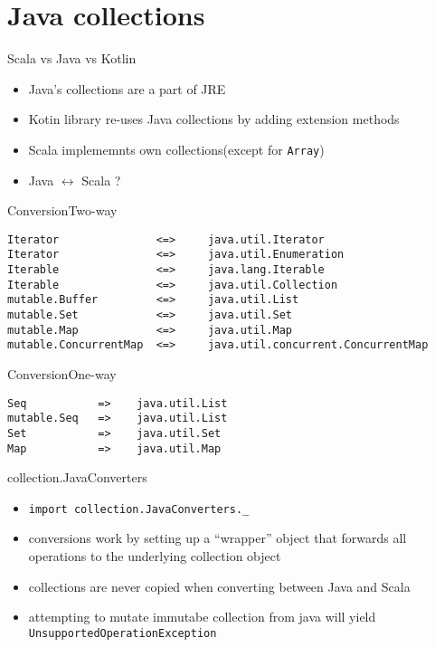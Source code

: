 \documentclass[aspectratio=169]{beamer}
\begin{document}

\section{Java collections}

\begin{frame}{Scala vs Java vs Kotlin}
  \begin{itemize}
    \item Java's collections are a part of JRE
      \pause
    \item Kotin library re-uses Java collections by adding extension methods
      \pause
    \item Scala implememnts own collections(except for \texttt{Array})
      \pause
      \item Java $\leftrightarrow$ Scala ?
  \end{itemize}  
\end{frame}

\begin{frame}[fragile]{Conversion}{Two-way}
\begin{verbatim}
Iterator               <=>     java.util.Iterator
Iterator               <=>     java.util.Enumeration
Iterable               <=>     java.lang.Iterable
Iterable               <=>     java.util.Collection
mutable.Buffer         <=>     java.util.List
mutable.Set            <=>     java.util.Set
mutable.Map            <=>     java.util.Map
mutable.ConcurrentMap  <=>     java.util.concurrent.ConcurrentMap
\end{verbatim}
\end{frame}

\begin{frame}[fragile]{Conversion}{One-way}
\begin{verbatim}
Seq           =>    java.util.List
mutable.Seq   =>    java.util.List
Set           =>    java.util.Set
Map           =>    java.util.Map
\end{verbatim}
\end{frame}

\begin{frame}[fragile]{collection.JavaConverters}
  \begin{itemize}
    \item \texttt{import collection.JavaConverters._} \cite{javaconv}
    \item  conversions work by setting up a “wrapper” object that forwards all operations to the
      underlying collection object
    \item collections are never copied when converting between Java and Scala
    \item attempting to mutate immutabe collection from java will yield
      \texttt{UnsupportedOperationException}
  \end{itemize}
\end{frame}
\end{document}
